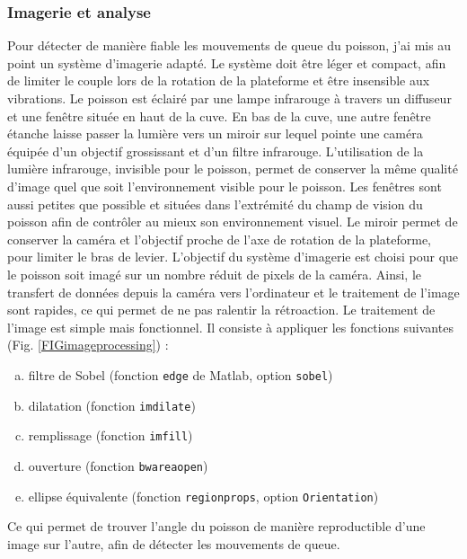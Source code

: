 \subsubsection{Imagerie et analyse}
Pour détecter de manière fiable les mouvements de queue du poisson, j'ai mis au point un système d'imagerie adapté. Le système doit être léger et compact, afin de limiter le couple lors de la rotation de la plateforme et être insensible aux vibrations. Le poisson est éclairé par une lampe infrarouge à travers un diffuseur et une fenêtre située en haut de la cuve. En bas de la cuve, une autre fenêtre étanche laisse passer la lumière vers un miroir sur lequel pointe une caméra équipée d'un objectif grossissant et d'un filtre infrarouge. L'utilisation de la lumière infrarouge, invisible pour le poisson, permet de conserver la même qualité d'image quel que soit l'environnement visible pour le poisson. Les fenêtres sont aussi petites que possible et situées dans l'extrémité du champ de vision du poisson afin de contrôler au mieux son environnement visuel. Le miroir permet de conserver la caméra et l'objectif proche de l'axe de rotation de la plateforme, pour limiter le bras de levier.
L'objectif du système d'imagerie est choisi pour que le poisson soit imagé sur un nombre réduit de pixels de la caméra. Ainsi, le transfert de données depuis la caméra vers l'ordinateur et le traitement de l'image sont rapides, ce qui permet de ne pas ralentir la rétroaction. Le traitement de l'image est simple mais fonctionnel. Il consiste à appliquer les fonctions suivantes (Fig. \ref{FIGimageprocessing}) :

\begin{enumerate}[a)] \itemsep0em \setcounter{enumi}{1}
    \item filtre de Sobel (fonction \verb|edge| de Matlab, option \verb|sobel|)
    \item dilatation (fonction \verb|imdilate|)
    \item remplissage (fonction \verb|imfill|)
    \item ouverture (fonction \verb|bwareaopen|)
    \item ellipse équivalente (fonction \verb|regionprops|, option \verb|Orientation|)
\end{enumerate}

Ce qui permet de trouver l'angle du poisson de manière reproductible d'une image sur l'autre, afin de détecter les mouvements de queue.

